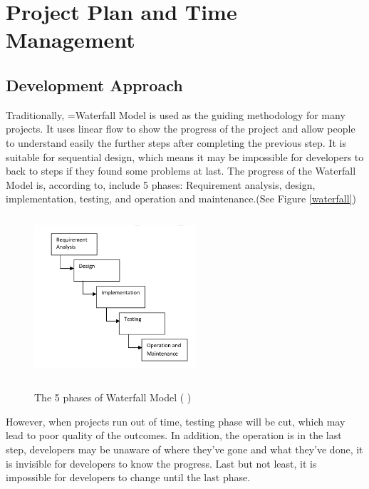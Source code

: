 \clearpage
\section{Project Plan and Time Management}

 

\subsection{Development Approach}

Traditionally, =Waterfall Model is used as the guiding methodology for many projects. It uses linear flow to show the progress of the project and allow people to understand easily the further steps after completing the previous step. It is suitable for sequential design, which means it may be impossible for developers to back to steps if they found some problems at last. 
The progress of the Waterfall Model is, according to\cite{Adenowo2013}, include 5 phases: Requirement analysis, design, implementation, testing, and operation and maintenance.(See Figure \ref{waterfall})

\begin{figure}[H]
	\centering	
	\includegraphics[width=6cm, height=6cm]{Figs/Waterfall-Model}\\[1ex]
	\caption{The 5 phases of Waterfall Model ( \cite{Adenowo2013})}
	\label{fig:waterfall}
\end{figure}

However, when projects run out of time, testing phase will be cut, which may lead to poor quality of the outcomes. In addition, the operation is in the last step, developers may be unaware of where they’ve gone and what they’ve done, it is invisible for developers to know the progress. Last but not least, it is impossible for developers to change until the last phase.


